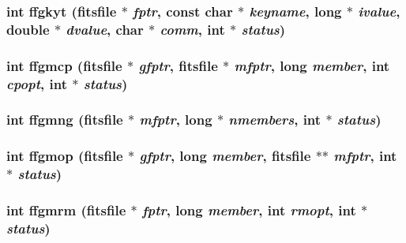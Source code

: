 \subsubsection{\setlength{\rightskip}{0pt plus 5cm}int ffgkyt (\bf{fitsfile} $\ast$ {\em fptr}, const char $\ast$ {\em keyname}, long $\ast$ {\em ivalue}, double $\ast$ {\em dvalue}, char $\ast$ {\em comm}, int $\ast$ {\em status})}\label{src_2fitsio_8h_dd68662c84062c1a1c4433358adb0e3f}


\subsubsection{\setlength{\rightskip}{0pt plus 5cm}int ffgmcp (\bf{fitsfile} $\ast$ {\em gfptr}, \bf{fitsfile} $\ast$ {\em mfptr}, long {\em member}, int {\em cpopt}, int $\ast$ {\em status})}\label{src_2fitsio_8h_d83bfc8f05c1ecdb704484508df35e48}


\subsubsection{\setlength{\rightskip}{0pt plus 5cm}int ffgmng (\bf{fitsfile} $\ast$ {\em mfptr}, long $\ast$ {\em nmembers}, int $\ast$ {\em status})}\label{src_2fitsio_8h_4ce8704aab9e63b3a93ccbf135f20eab}


\subsubsection{\setlength{\rightskip}{0pt plus 5cm}int ffgmop (\bf{fitsfile} $\ast$ {\em gfptr}, long {\em member}, \bf{fitsfile} $\ast$$\ast$ {\em mfptr}, int $\ast$ {\em status})}\label{src_2fitsio_8h_eb970a59dfa22c61d5df8bc212391228}


\subsubsection{\setlength{\rightskip}{0pt plus 5cm}int ffgmrm (\bf{fitsfile} $\ast$ {\em fptr}, long {\em member}, int {\em rmopt}, int $\ast$ {\em status})}\label{src_2fitsio_8h_ae2190c557659d6bea87a6ba2e5c152b}


